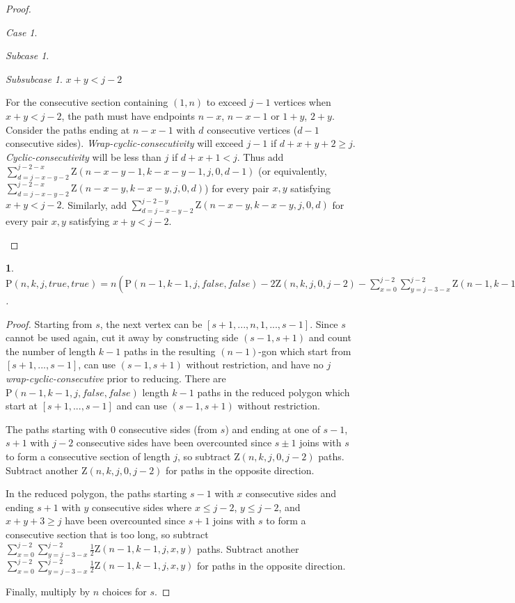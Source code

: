 \documentclass[a4paper, 12pt] {article}
\theoremstyle{remark}
\theoremstyle{plain}
\newcommand{\thistheoremname}{}
\newtheorem{genericthm}[theorem]{\thistheoremname}
\newenvironment{namedthm}[1]
  {\renewcommand{\thistheoremname}{#1}
   \begin{genericthm}}
  {\end{genericthm}}
\theoremstyle{remark}
\newtheorem{case}{Case}
\newtheorem{subcase}{Subcase}[case]
\newtheorem{subsubcase}{Subsubcase}[subcase]
\begin{document}
\begin{proof}
\begin{case}
\begin{subcase}
\begin{subsubcase} $x+y < j-2$

For the consecutive section containing $(1,n)$ to exceed $j-1$ vertices when $x+y < j-2$, the path must have endpoints $n-x$, $n-x-1$ or $1+y$, $2+y$. Consider the paths ending at $n-x-1$ with $d$ consecutive vertices ($d-1$ consecutive sides). \textit{Wrap-cyclic-consecutivity} will exceed $j-1$ if $d+x+y+2 \geq j$. \textit{Cyclic-consecutivity} will be less than $j$ if $d+x+1<j$. Thus add $\sum_{d=j-x-y-2}^{j-2-x} \mathrm{Z}(n-x-y-1,k-x-y-1,j,0,d-1)$ (or equivalently, $\sum_{d=j-x-y-2}^{j-2-x} \mathrm{Z}(n-x-y,k-x-y,j,0,d)$) for every pair $x, y$ satisfying $x+y<j-2$. Similarly, add $\sum_{d=j-x-y-2}^{j-2-y} \mathrm{Z}(n-x-y,k-x-y,j,0,d)$ for every pair $x, y$ satisfying $x+y<j-2$.
\end{subsubcase}

\end{subcase}

\end{case}

\end{proof}


\begin{namedthm}{Restricted Wrap-Cyclic-Consecutivity Theorem}
\label{restricted_wrap-cyclic-consecutivity}
$\mathrm{P}(n,k,j,true, \allowbreak true)=n(\mathrm{P}(n-1,k-1,j,false,false)-2\mathrm{Z}(n,k,j,0,j-2)-\sum_{x=0}^{j-2} \sum_{y=j-3-x}^{j-2} \allowbreak \mathrm{Z}(n-1,k-1,j,x,y))$.
\end{namedthm}

\begin{proof}
Starting from $s$, the next vertex can be $[s+1,...,n,1,...,s-1]$. Since $s$ cannot be used again, cut it away by constructing side $(s-1,s+1)$ and count the number of length $k-1$ paths in the resulting $(n-1)$-gon which start from $[s+1,...,s-1]$, can use $(s-1,s+1)$ without restriction, and have no $j$ \textit{wrap-cyclic-consecutive} prior to reducing. There are $\mathrm{P}(n-1,k-1,j,false,false)$ length $k-1$ paths in the reduced polygon which start at $[s+1,...,s-1]$ and can use $(s-1,s+1)$ without restriction.

The paths starting with $0$ consecutive sides (from $s$) and ending at one of $s-1$, $s+1$ with $j-2$ consecutive sides have been overcounted since $s \pm 1$ joins with $s$ to form a consecutive section of length $j$, so subtract $\mathrm{Z}(n,k,j,0,j-2)$ paths. Subtract another $\mathrm{Z}(n,k,j,0,j-2)$ for paths in the opposite direction.

In the reduced polygon, the paths starting $s-1$ with $x$ consecutive sides and ending $s+1$ with $y$ consecutive sides where $x \leq j-2$, $y \leq j-2$, and $x+y+3 \geq j$ have been overcounted since $s+1$ joins with $s$ to form a consecutive section that is too long, so subtract $\sum_{x=0}^{j-2} \sum_{y=j-3-x}^{j-2} \frac{1}{2}\mathrm{Z}(n-1,k-1,j,x,y)$ paths. Subtract another $\sum_{x=0}^{j-2} \sum_{y=j-3-x}^{j-2} \frac{1}{2}\mathrm{Z}(n-1,k-1,j,x,y)$ for paths in the opposite direction.

Finally, multiply by $n$ choices for $s$.
\end{proof}
\end{document}
